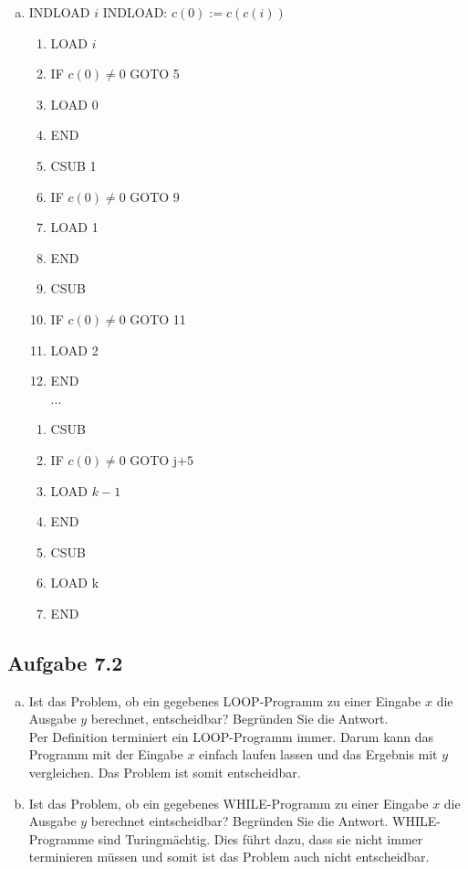 \begin{enumerate}[(a)]
	\item INDLOAD $i$
	INDLOAD: $c(0) := c(c(i))$
	\begin{enumerate}[ 1.]
		\item LOAD $i$
		\item IF $c(0) \neq 0$ GOTO 5
		\item LOAD 0
		\item END
		\item CSUB 1
		\item IF $c(0) \neq 0$ GOTO 9
		\item LOAD 1
		\item END
		\item CSUB
		\item IF $c(0) \neq 0$ GOTO 11
		\item LOAD 2
		\item END\\
		...
	\end{enumerate}
	\begin{enumerate}[j+1]
		\item CSUB
		\item IF $c(0) \neq 0$ GOTO j$+5$
		\item LOAD $k-1$
		\item END
		\item CSUB
		\item LOAD k
		\item END
	\end{enumerate}
\end{enumerate}

\subsection*{Aufgabe 7.2}
\begin{enumerate}[(a)]
	\item Ist das Problem, ob ein gegebenes LOOP-Programm zu einer Eingabe $x$ die Ausgabe $y$ berechnet, entscheidbar? Begründen Sie die Antwort.\\
	Per Definition terminiert ein LOOP-Programm immer. Darum kann das Programm mit der Eingabe $x$ einfach laufen lassen und das Ergebnis mit $y$ vergleichen. Das Problem ist somit entscheidbar.
	\item Ist das Problem, ob ein gegebenes WHILE-Programm zu einer Eingabe $x$ die Ausgabe $y$ berechnet eintscheidbar? Begründen Sie die Antwort.
	WHILE-Programme sind Turingmächtig. Dies führt dazu, dass sie nicht immer terminieren müssen und somit ist
	das Problem auch nicht entscheidbar.
\end{enumerate}
